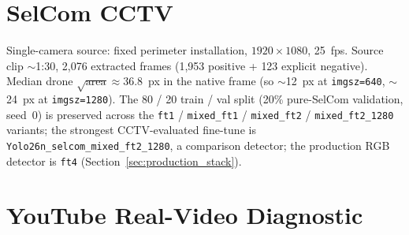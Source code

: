 \section{SelCom CCTV}

Single-camera source: fixed perimeter installation, $1920{\times}1080$, 25~fps. Source clip $\sim$1:30, 2{,}076 extracted frames (1{,}953 positive + 123 explicit negative). Median drone $\sqrt{\text{area}} \approx 36.8$~px in the native frame (so $\sim$12~px at \texttt{imgsz=640}, $\sim$24~px at \texttt{imgsz=1280}). The 80 / 20 train / val split (20\% pure-SelCom validation, seed~0) is preserved across the \texttt{ft1} / \texttt{mixed\_ft1} / \texttt{mixed\_ft2} / \texttt{mixed\_ft2\_1280} variants; the strongest CCTV-evaluated fine-tune is \texttt{Yolo26n\_selcom\_mixed\_ft2\_1280}, a comparison detector; the production RGB detector is \texttt{ft4} (Section~\ref{sec:production_stack}).

\section{YouTube Real-Video Diagnostic}

